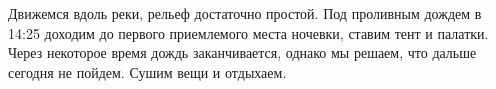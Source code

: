     Движемся вдоль реки, рельеф достаточно простой. Под проливным дождем в 14:25 доходим до первого приемлемого места
    ночевки, ставим тент и палатки. Через некоторое время дождь заканчивается, однако мы решаем, что дальше сегодня
    не пойдем. Сушим вещи и отдыхаем.

    \FloatBarrier
    









